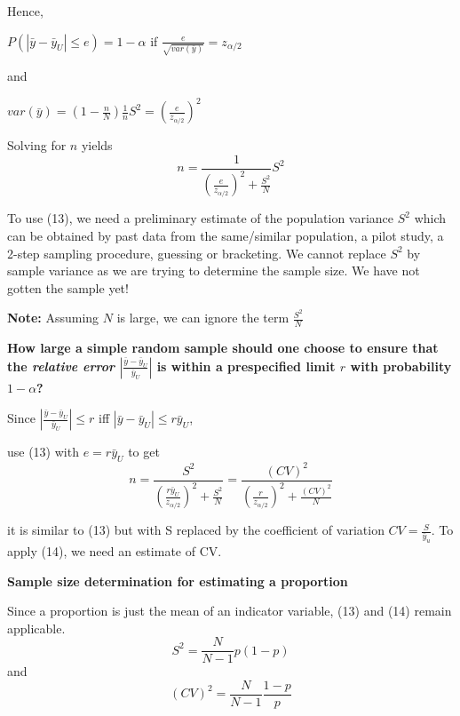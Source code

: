 \documentclass[10pt,landscape]{article}
\begin{document}
\begin{multicols}{3}
Hence,
\begin{center}
$P(|\bar{y}-\bar{y}_{U}| \le e) = 1- \alpha$ if $\frac{e}{\sqrt{var(\bar{y})}} = z_{\alpha/2}$
\end{center}
and
\begin{center}
$var(\bar{y}) = (1-\frac{n}{N})\frac{1}{n}S^{2} = \left(\frac{e}{z_{\alpha/2}}\right)^{2}$
\end{center}

Solving for $n$ yields
\begin{equation}
  n = \frac{1}{\left(\frac{e}{z_{\alpha/2}}\right)^{2} + \frac{S^{2}}{N}}S^{2}
\end{equation}

To use (13), we need a preliminary estimate of the population variance $S^{2}$ which can be obtained by past data from the same/similar population, a pilot study, a 2-step sampling procedure, guessing or bracketing. We cannot replace $S^{2}$ by sample variance as we are trying to determine the sample size. We have not gotten the sample yet!

\textbf{Note:} Assuming $N$ is large, we can ignore the term $\frac{S^{2}}{N}$

\vspace{10}

\textbf{How large a simple random sample should one choose to ensure that the \textit{relative error} $\left|\frac{\bar{y}-\bar{y}_{U}}{\bar{y}_{U}}\right|$ is within a prespecified limit $r$ with probability $1-\alpha$?}

\vspace{10}

Since $\left|\frac{\bar{y}-\bar{y}_{U}}{\bar{y}_{U}}\right| \leq r$ iff $|\bar{y}-\bar{y}_{U}| \leq r\bar{y}_{U}$,

use (13) with $e = r\bar{y}_{U}$ to get
\begin{equation}
  n = \frac{S^{2}}{\left(\frac{r\bar{y}_{U}}{z_{\alpha/2}}\right)^{2} + \frac{S^{2}}{N}} = \frac{(CV)^{2}}{\left(\frac{r}{z_{\alpha/2}}\right)^{2} + \frac{(CV)^{2}}{N}}
\end{equation}

it is similar to (13) but with S replaced by the coefficient of variation $CV = \frac{S}{\bar{y}_{u}}$. To apply (14), we need an estimate of CV.

\vspace{10}

\textbf{Sample size determination for estimating a proportion}

Since a proportion is just the mean of an indicator variable, (13) and (14) remain applicable.
\begin{equation}
  S^{2} = \frac{N}{N-1}p(1-p)
\end{equation}
and
\begin{equation}
  (CV)^{2} = \frac{N}{N-1}\frac{1-p}{p}
\end{equation}


\end{multicols}
\end{document}
